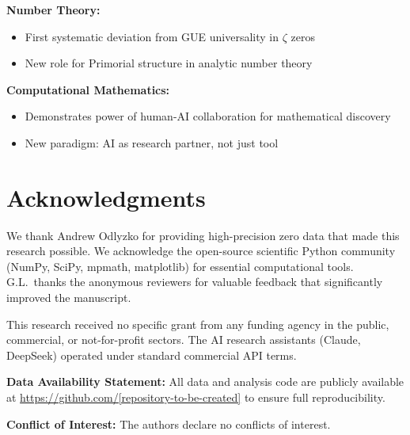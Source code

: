 \documentclass[12pt]{article}
\begin{document}
\textbf{Number Theory:}
\begin{itemize}
\item First systematic deviation from GUE universality in $\zeta$ zeros
\item New role for Primorial structure in analytic number theory
\end{itemize}

\textbf{Computational Mathematics:}
\begin{itemize}
\item Demonstrates power of human-AI collaboration for mathematical discovery
\item New paradigm: AI as research partner, not just tool
\end{itemize}

\section*{Acknowledgments}

We thank Andrew Odlyzko for providing high-precision zero data that made this research possible. We acknowledge the open-source scientific Python community (NumPy, SciPy, mpmath, matplotlib) for essential computational tools. G.L.\ thanks the anonymous reviewers for valuable feedback that significantly improved the manuscript.

This research received no specific grant from any funding agency in the public, commercial, or not-for-profit sectors. The AI research assistants (Claude, DeepSeek) operated under standard commercial API terms.

\textbf{Data Availability Statement:} All data and analysis code are publicly available at \url{https://github.com/[repository-to-be-created]} to ensure full reproducibility.

\textbf{Conflict of Interest:} The authors declare no conflicts of interest.
\end{document}

